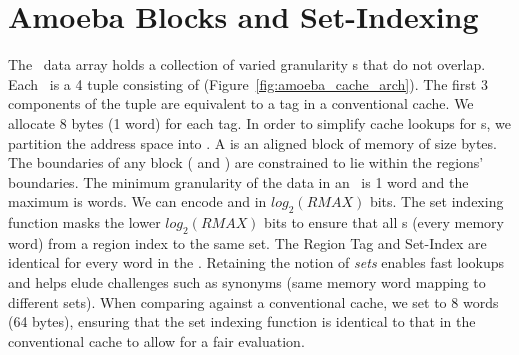\section{Amoeba Blocks and Set-Indexing}


\begin{figure}[h]
  \caption[Memory Regions]{ }
  \label{fig:mem_region_addr}
\end{figure}


The \AC\ data array holds a collection of varied granularity \AB{}s that do not overlap. Each \AB\ is a 4 tuple consisting of  (Figure~\ref{fig:amoeba_cache_arch}). The first 3 components of the tuple are equivalent to a tag in a conventional cache. We allocate 8 bytes (1 word) for each tag. In order to simplify cache lookups for \AB{}s, we partition the address space into . A  is an aligned block of memory of size  bytes. The boundaries of any \AB{} block ( and ) are constrained to lie within the regions' boundaries. The minimum granularity of the data in an \AB\ is 1 word and the maximum is  words. We can encode  and  in $log_2(RMAX)$ bits. The set indexing function masks the lower $log_2(RMAX)$ bits to ensure that all \AB{}s (every memory word) from a region index to the same set. The Region Tag and Set-Index are identical for every word in the \AB{}. Retaining the notion of \textit{sets} enables fast lookups and helps elude challenges such as synonyms (same memory word mapping to different sets). When comparing against a conventional cache, we set  to 8 words (64 bytes), ensuring that the set indexing function is identical to that in the conventional cache to allow for a fair evaluation.



